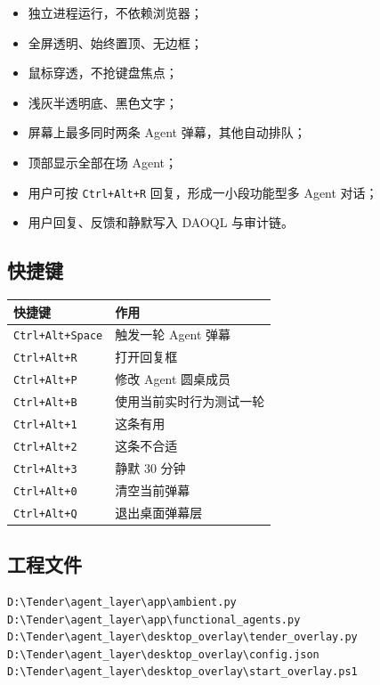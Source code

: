 \documentclass[UTF8,a4paper,11pt]{ctexart}
\begin{document}
\begin{itemize}[leftmargin=2em]
\item 独立进程运行，不依赖浏览器；
\item 全屏透明、始终置顶、无边框；
\item 鼠标穿透，不抢键盘焦点；
\item 浅灰半透明底、黑色文字；
\item 屏幕上最多同时两条 Agent 弹幕，其他自动排队；
\item 顶部显示全部在场 Agent；
\item 用户可按 \texttt{Ctrl+Alt+R} 回复，形成一小段功能型多 Agent 对话；
\item 用户回复、反馈和静默写入 DAOQL 与审计链。
\end{itemize}

\subsection{快捷键}

\begin{longtable}{@{}p{4.5cm}p{8.0cm}@{}}
\toprule
快捷键 & 作用 \\
\midrule
\texttt{Ctrl+Alt+Space} & 触发一轮 Agent 弹幕 \\
\texttt{Ctrl+Alt+R} & 打开回复框 \\
\texttt{Ctrl+Alt+P} & 修改 Agent 圆桌成员 \\
\texttt{Ctrl+Alt+B} & 使用当前实时行为测试一轮 \\
\texttt{Ctrl+Alt+1} & 这条有用 \\
\texttt{Ctrl+Alt+2} & 这条不合适 \\
\texttt{Ctrl+Alt+3} & 静默 30 分钟 \\
\texttt{Ctrl+Alt+0} & 清空当前弹幕 \\
\texttt{Ctrl+Alt+Q} & 退出桌面弹幕层 \\
\bottomrule
\end{longtable}

\subsection{工程文件}

\begin{verbatim}
D:\Tender\agent_layer\app\ambient.py
D:\Tender\agent_layer\app\functional_agents.py
D:\Tender\agent_layer\desktop_overlay\tender_overlay.py
D:\Tender\agent_layer\desktop_overlay\config.json
D:\Tender\agent_layer\desktop_overlay\start_overlay.ps1
\end{verbatim}
\end{document}
